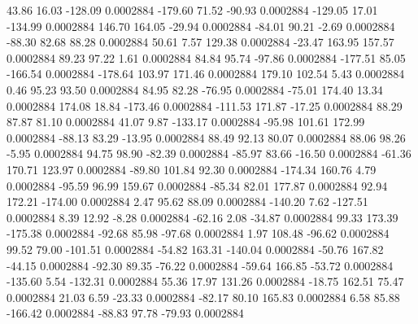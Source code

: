       43.86       16.03     -128.09     0.0002884
     -179.60       71.52      -90.93     0.0002884
     -129.05       17.01     -134.99     0.0002884
      146.70      164.05      -29.94     0.0002884
      -84.01       90.21       -2.69     0.0002884
      -88.30       82.68       88.28     0.0002884
       50.61        7.57      129.38     0.0002884
      -23.47      163.95      157.57     0.0002884
       89.23       97.22        1.61     0.0002884
       84.84       95.74      -97.86     0.0002884
     -177.51       85.05     -166.54     0.0002884
     -178.64      103.97      171.46     0.0002884
      179.10      102.54        5.43     0.0002884
        0.46       95.23       93.50     0.0002884
       84.95       82.28      -76.95     0.0002884
      -75.01      174.40       13.34     0.0002884
      174.08       18.84     -173.46     0.0002884
     -111.53      171.87      -17.25     0.0002884
       88.29       87.87       81.10     0.0002884
       41.07        9.87     -133.17     0.0002884
      -95.98      101.61      172.99     0.0002884
      -88.13       83.29      -13.95     0.0002884
       88.49       92.13       80.07     0.0002884
       88.06       98.26       -5.95     0.0002884
       94.75       98.90      -82.39     0.0002884
      -85.97       83.66      -16.50     0.0002884
      -61.36      170.71      123.97     0.0002884
      -89.80      101.84       92.30     0.0002884
     -174.34      160.76        4.79     0.0002884
      -95.59       96.99      159.67     0.0002884
      -85.34       82.01      177.87     0.0002884
       92.94      172.21     -174.00     0.0002884
        2.47       95.62       88.09     0.0002884
     -140.20        7.62     -127.51     0.0002884
        8.39       12.92       -8.28     0.0002884
      -62.16        2.08      -34.87     0.0002884
       99.33      173.39     -175.38     0.0002884
      -92.68       85.98      -97.68     0.0002884
        1.97      108.48      -96.62     0.0002884
       99.52       79.00     -101.51     0.0002884
      -54.82      163.31     -140.04     0.0002884
      -50.76      167.82      -44.15     0.0002884
      -92.30       89.35      -76.22     0.0002884
      -59.64      166.85      -53.72     0.0002884
     -135.60        5.54     -132.31     0.0002884
       55.36       17.97      131.26     0.0002884
      -18.75      162.51       75.47     0.0002884
       21.03        6.59      -23.33     0.0002884
      -82.17       80.10      165.83     0.0002884
        6.58       85.88     -166.42     0.0002884
      -88.83       97.78      -79.93     0.0002884
